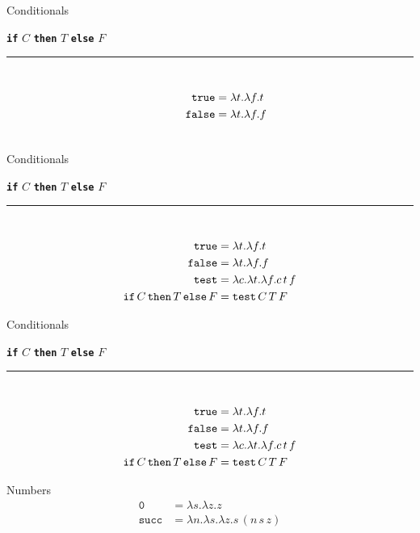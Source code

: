 \documentclass{beamer}
\newcommand{\kw}[1]{{\bf \texttt{#1}}}
\newcommand{\mkw}[1]{{\bf \mathtt{#1}}}
\newcommand{\msym}[1]{\mathtt{#1}}
\newcommand{\hr}[0]{\rule{10.75cm}{0.4pt}\\}
\begin{document}
\begin{frame}{Conditionals}
\begin{center}
\kw{if} $C$ \kw{then} $T$ \kw{else} $F$
\end{center}
\hr
\begin{align*}
\msym{true}  &= \lambda t.\lambda f.t \\
\msym{false} &= \lambda t.\lambda f.f
\phantom{\msym{test} = \lambda c.\lambda t.\lambda f.c\,t\,f} \\
\phantom{\mkw{if}\,C\,\mkw{then}\,T\,\mkw{else}\,F = \msym{test}\,C\,T\,F}
\end{align*}
\end{frame}
\begin{frame}{Conditionals}
\begin{center}
\kw{if} $C$ \kw{then} $T$ \kw{else} $F$
\end{center}
\hr
\begin{align*}
\msym{true}  &= \lambda t.\lambda f.t \\
\msym{false} &= \lambda t.\lambda f.f \\
\msym{test} &= \lambda c.\lambda t.\lambda f.c\,t\,f \\
\mkw{if}\,C\,\mkw{then}\,T\,\mkw{else}\,F &= \msym{test}\,C\,T\,F
\end{align*}
\end{frame}
\begin{frame}{Conditionals}
\begin{center}
\kw{if} $C$ \kw{then} $T$ \kw{else} $F$
\end{center}
\hr
\begin{align*}
\msym{true}  &= \lambda t.\lambda f.t \\
\msym{false} &= \lambda t.\lambda f.f \\
\msym{test} &= \lambda c.\lambda t.\lambda f.c\,t\,f \\
\mkw{if}\,C\,\mkw{then}\,T\,\mkw{else}\,F &= \msym{test}\,C\,T\,F
\end{align*}
\end{frame}
\begin{frame}{Numbers}
\begin{align*}
\msym{0}    &= \lambda s.\lambda z.z \\
\msym{succ} &= \lambda n.\lambda s.\lambda z.s\,(n\,s\,z)
\end{align*}
\end{frame}
\end{document}

